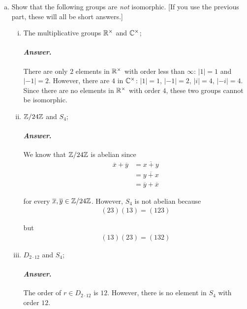 \documentclass[11pt, reqno]{amsart}
\theoremstyle{plain}
\theoremstyle{definition}
\theoremstyle{example}
\newenvironment{ans}{\color{black}\medskip \paragraph*{\emph{Answer}.}}{\hfill \break  $~\!\!$ \dotfill \medskip }
\begin{document}
\begin{enumerate}[1.]
\begin{enumerate}[(a)]
\begin{enumerate}[(i)]
\begin{proof}
Thus, if $g^m \neq 1$ for some $m$, then $\varphi(g)^m \neq 1$ as well. So if $|g| = n$, then every power $g^k$ with $k \in \{1, \cdots, n-1\}$ is such that $g^k \neq 1$ and $\varphi(g)^k \neq 1$\\

In addition, from what we have proved above, we have $g^n = 1 \implies \varphi(g)^n = 1$. Since we showed that neither $g^k$ nor $\varphi^k$ are $1$ for any $k \in \{1, \cdots, n-1\}$, we have that $|g| = |\varphi(g)| = n$
\end{proof}
\end{enumerate}
\item Show that the following groups are \emph{not} isomorphic. [If you use the previous part, these will all be short answers.]
\begin{enumerate}[(i)]
\item The multiplicative groups $\mathbb{R}^\times$ and $\mathbb{C}^\times$;
\begin{ans}
There are only $2$ elements in $\mathbb{R}^\times$ with order less than $\infty$: $|1| = 1$ and $|-1| = 2$. However, there are $4$ in $\mathbb{C}^\times$: $|1| = 1$, $|-1| = 2$, $|i| = 4$, $|-i| = 4$.\\

Since there are no elements in $\mathbb{R}^\times$ with order $4$, these two groups cannot be isomorphic.
\end{ans}
\item $\mathbb{Z}/24\mathbb{Z}$ and $S_4$;
\begin{ans}
We know that $\mathbb{Z}/24\mathbb{Z}$ is abelian since
\begin{align*}
\overline{x} + \overline{y} &= \overline{x + y}\\
&= \overline{y + x}\\
&= \overline{y} + \overline{x}
\end{align*}

for every $\overline{x}, \overline{y} \in \mathbb{Z}/24\mathbb{Z}$. However, $S_4$ is not abelian because
\begin{align*}
(2 3)(1 3) = (1 2 3)
\end{align*}

but
\begin{align*}
(1 3)(2 3) = (1 3 2)
\end{align*}
\end{ans}

\item $D_{2\cdot12}$ and $S_4$;
\begin{ans}
The order of $r \in D_{2 \cdot 12}$ is $12$. However, there is no element in $S_4$ with order $12$.
\end{ans}


\end{enumerate}
\end{enumerate}
\end{enumerate}
\end{document}
